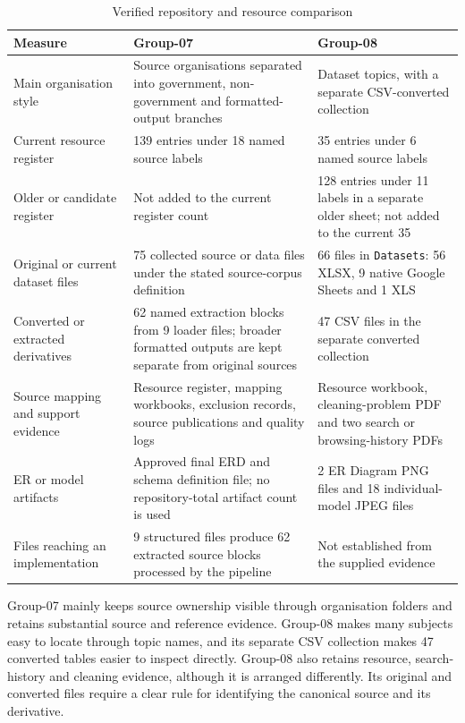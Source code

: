 \begin{table}[H]
\centering
\caption{Verified repository and resource comparison}
\label{tab:verified-repository-comparison}
\small
\begin{tabular}{L{0.24\textwidth}L{0.34\textwidth}L{0.34\textwidth}}
\toprule
Measure & Group-07 & Group-08 \\
\midrule
Main organisation style & Source organisations separated into government,
non-government and formatted-output branches & Dataset topics, with a separate
CSV-converted collection \\
Current resource register & 139 entries under 18 named source labels & 35
entries under 6 named source labels \\
Older or candidate register & Not added to the current register count & 128
entries under 11 labels in a separate older sheet; not added to the current 35
\\
Original or current dataset files & 75 collected source or data files under the
stated source-corpus definition & 66 files in \texttt{Datasets}: 56 XLSX, 9
native Google Sheets and 1 XLS \\
Converted or extracted derivatives & 62 named extraction blocks from 9 loader
files; broader formatted outputs are kept separate from original sources & 47
CSV files in the separate converted collection \\
Source mapping and support evidence & Resource register, mapping workbooks,
exclusion records, source publications and quality logs & Resource workbook,
cleaning-problem PDF and two search or browsing-history PDFs \\
ER or model artifacts & Approved final ERD and schema definition file; no
repository-total artifact count is used & 2 ER Diagram PNG files and 18
individual-model JPEG files \\
Files reaching an implementation & 9 structured files produce 62 extracted
source blocks processed by the pipeline & Not established from the supplied
evidence \\
\bottomrule
\end{tabular}
\end{table}

Group-07 mainly keeps source ownership visible through organisation folders and
retains substantial source and reference evidence. Group-08 makes many subjects
easy to locate through topic names, and its separate CSV collection makes 47
converted tables easier to inspect directly. Group-08 also retains resource,
search-history and cleaning evidence, although it is arranged differently. Its
original and converted files require a clear rule for identifying the canonical
source and its derivative.

